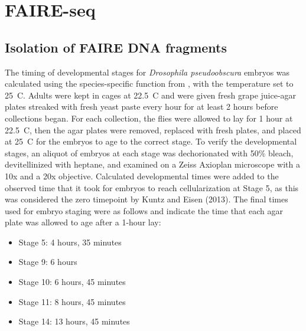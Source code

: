 \section{FAIRE-seq}
\subsection{Isolation of FAIRE DNA fragments}
The timing of developmental stages for \emph{Drosophila pseudoobscura} embryos was calculated using the species-specific function from \citet{kuntz_native_2013}, with the temperature set to 25\degree~C. Adults were kept in cages at 22.5\degree~C and were given fresh grape juice-agar plates streaked with fresh yeast paste every hour for at least 2 hours before collections began. For each collection, the flies were allowed to lay for 1 hour at 22.5\degree~C, then the agar plates were removed, replaced with fresh plates, and placed at 25\degree~C for the embryos to age to the correct stage. To verify the developmental stages, an aliquot of embryos at each stage was dechorionated with 50\% bleach, devitellinized with heptane, and examined on a Zeiss Axioplan microscope with a 10x and a 20x objective. Calculated developmental times were added to the observed time that it took for embryos to reach cellularization at Stage 5, as this was considered the zero timepoint by Kuntz and Eisen (2013). The final times used for embryo staging were as follows and indicate the time that each agar plate was allowed to age after a 1-hour lay:
\begin{itemize}
	\item Stage 5: 4 hours, 35 minutes
	\item Stage 9: 6 hours
	\item Stage 10: 6 hours, 45 minutes
	\item Stage 11: 8 hours, 45 minutes
	\item Stage 14: 13 hours, 45 minutes
\end{itemize}
